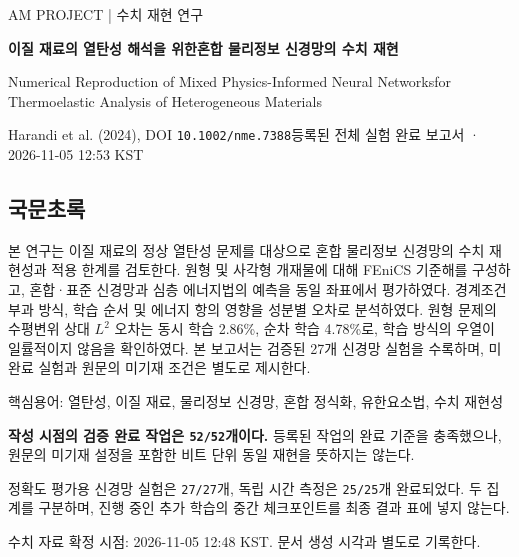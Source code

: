 \documentclass[10pt,a4paper]{article}
\begin{document}
AM PROJECT  |  수치 재현 연구\par

{\LARGE\bfseries\sffamily\color{ink} 이질 재료의 열탄성 해석을 위한\newline 혼합 물리정보 신경망의 수치 재현\par}\vspace{5mm}

{\small\color{muted} Numerical Reproduction of Mixed Physics-Informed Neural Networks\newline for Thermoelastic Analysis of Heterogeneous Materials\par}

{\small\color{muted} Harandi et al. (2024), DOI \nolinkurl{10.1002/nme.7388}\newline 등록된 전체 실험 완료 보고서 · 2026-11-05 12:53 KST\par}

\subsection{국문초록}

본 연구는 이질 재료의 정상 열탄성 문제를 대상으로 혼합 물리정보 신경망의 수치 재현성과 적용 한계를 검토한다. 원형 및 사각형 개재물에 대해 FEniCS 기준해를 구성하고, 혼합·표준 신경망과 심층 에너지법의 예측을 동일 좌표에서 평가하였다. 경계조건 부과 방식, 학습 순서 및 에너지 항의 영향을 성분별 오차로 분석하였다. 원형 문제의 수평변위 상대 $L^2$ 오차는 동시 학습 2.86\%, 순차 학습 4.78\%로, 학습 방식의 우열이 일률적이지 않음을 확인하였다. 본 보고서는 검증된 27개 신경망 실험을 수록하며, 미완료 실험과 원문의 미기재 조건은 별도로 제시한다.\par

{\small\color{muted} 핵심용어: 열탄성, 이질 재료, 물리정보 신경망, 혼합 정식화, 유한요소법, 수치 재현성\par}

\textbf{작성 시점의 검증 완료 작업은 \nolinkurl{52/52}개이다.} 등록된 작업의 완료 기준을 충족했으나, 원문의 미기재 설정을 포함한 비트 단위 동일 재현을 뜻하지는 않는다.\par

{\small\color{muted} 정확도 평가용 신경망 실험은 \nolinkurl{27/27}개, 독립 시간 측정은 \nolinkurl{25/25}개 완료되었다. 두 집계를 구분하며, 진행 중인 추가 학습의 중간 체크포인트를 최종 결과 표에 넣지 않는다.\par}

{\small\color{muted} 수치 자료 확정 시점: 2026-11-05 12:48 KST. 문서 생성 시각과 별도로 기록한다.\par}
\end{document}

